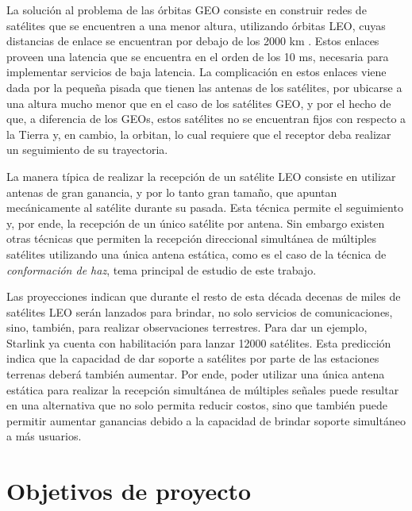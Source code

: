 La solución al problema de las órbitas GEO consiste en construir redes de satélites que se encuentren a una menor altura, utilizando órbitas LEO, cuyas distancias de enlace se encuentran por debajo de los 2000 km \cite{bib:esa_leo}. Estos enlaces proveen una latencia que se encuentra en el orden de los 10 ms, necesaria para implementar servicios de baja latencia. La complicación en estos enlaces viene dada por la pequeña pisada que tienen las antenas de los satélites, por ubicarse a una altura mucho menor que en el caso de los satélites GEO, y por el hecho de que, a diferencia de los GEOs, estos satélites no se encuentran fijos con respecto a la Tierra y, en cambio, la orbitan, lo cual requiere que el receptor deba realizar un seguimiento de su trayectoria.

La manera típica de realizar la recepción de un satélite LEO consiste en utilizar antenas de gran ganancia, y por lo tanto gran tamaño, que apuntan mecánicamente al satélite durante su pasada. Esta técnica permite el seguimiento y, por ende, la recepción de un único satélite por antena. Sin embargo existen otras técnicas que permiten la recepción direccional simultánea de múltiples satélites utilizando una única antena estática, como es el caso de la técnica de \emph{conformación de haz}, tema principal de estudio de este trabajo.

Las proyecciones indican que durante el resto de esta década decenas de miles de satélites LEO serán lanzados para brindar, no solo servicios de comunicaciones, sino, también, para realizar observaciones terrestres. Para dar un ejemplo, Starlink ya cuenta con habilitación para lanzar 12000 satélites. Esta predicción indica que la capacidad de dar soporte a satélites por parte de las estaciones terrenas deberá también aumentar. Por ende, poder utilizar una única antena estática para realizar la recepción simultánea de múltiples señales puede resultar en una alternativa que no solo permita reducir costos, sino que también puede permitir aumentar ganancias debido a la capacidad de brindar soporte simultáneo a más usuarios.

\section{Objetivos de proyecto}\label{subc:intro_objetivos}

